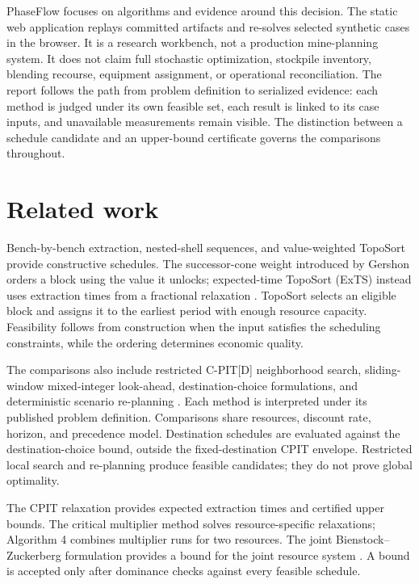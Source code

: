 \documentclass[11pt]{article}
\begin{document}
PhaseFlow focuses on algorithms and evidence around this decision. The static web application replays committed artifacts and re-solves selected synthetic cases in the browser. It is a research workbench, not a production mine-planning system. It does not claim full stochastic optimization, stockpile inventory, blending recourse, equipment assignment, or operational reconciliation.
The report follows the path from problem definition to serialized evidence: each method is judged under its own feasible set, each result is linked to its case inputs, and unavailable measurements remain visible. The distinction between a schedule candidate and an upper-bound certificate governs the comparisons throughout.

\section{Related work}
Bench-by-bench extraction, nested-shell sequences, and value-weighted TopoSort provide constructive schedules. The successor-cone weight introduced by Gershon orders a block using the value it unlocks; expected-time TopoSort (ExTS) instead uses extraction times from a fractional relaxation \cite{gershon,chicoisne,lambert2014}. TopoSort selects an eligible block and assigns it to the earliest period with enough resource capacity. Feasibility follows from construction when the input satisfies the scheduling constraints, while the ordering determines economic quality.

The comparisons also include restricted C-PIT[D] neighborhood search, sliding-window mixed-integer look-ahead, destination-choice formulations, and deterministic scenario re-planning \cite{blom,caccetta2003,cullenbine2011}. Each method is interpreted under its published problem definition. Comparisons share resources, discount rate, horizon, and precedence model. Destination schedules are evaluated against the destination-choice bound, outside the fixed-destination CPIT envelope. Restricted local search and re-planning produce feasible candidates; they do not prove global optimality.

The CPIT relaxation provides expected extraction times and certified upper bounds. The critical multiplier method solves resource-specific relaxations; Algorithm 4 combines multiplier runs for two resources. The joint Bienstock--Zuckerberg formulation provides a bound for the joint resource system \cite{bienstock,munoz2017}. A bound is accepted only after dominance checks against every feasible schedule.
\end{document}
